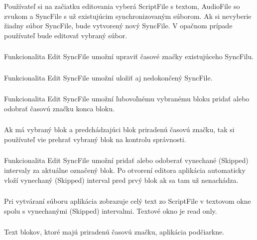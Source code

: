 \documentclass{article}
\begin{document}
\subsubsection{}
Používateľ si na začiatku editovania vyberá ScriptFile s textom, AudioFile so zvukom a SyncFile s už existujúcim synchronizovaným súborom. Ak si nevyberie žiadny súbor SyncFile, bude vytvorený nový SyncFile. V opačnom prípade používateľ bude editovať vybraný súbor.

\subsubsection{}
Funkcionalita Edit SyncFile umožní upraviť časové značky existujúceho SyncFilu.

\subsubsection{}
Funkcionalita Edit SyncFile umožní uložiť aj nedokončený SyncFile.

\subsubsection{}
Funkcionalita Edit SyncFile umožní ľubovoľnému vybranému bloku pridať alebo odobrať časovú značku konca bloku. 

\subsubsection{}
Ak má vybraný blok a predchádzajúci blok priradenú časovú značku, tak si používateľ vie prehrať vybraný blok na kontrolu správnosti.

\subsubsection{}
Funkcionalita Edit SyncFile umožní pridať alebo odoberať vynechané (Skipped) intervaly za aktuálne označený blok. Po otvorení editora aplikácia automaticky vloží vynechaný (Skipped) interval pred prvý blok ak sa tam už nenachádza.

\subsubsection{}
Pri vytváraní súboru aplikácia zobrazuje celý text zo ScriptFile v textovom okne spolu s vynechanými (Skipped) intervalmi. Textové okno je read only.

\subsubsection{}
Text blokov, ktoré majú priradenú časovú značku, aplikácia podčiarkne. 
\end{document}

